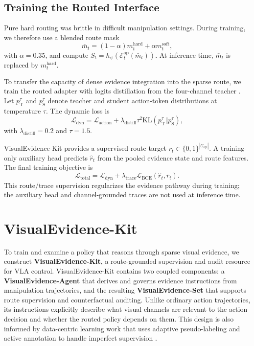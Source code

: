 \subsection{Training the Routed Interface}

Pure hard routing was brittle in difficult manipulation settings. During training, we therefore use a blended route mask
\begin{equation}
\bar m_t = (1-\alpha)m_t^{\mathrm{hard}} + \alpha m_t^{\mathrm{soft}},
\end{equation}
with $\alpha = 0.35$, and compute $S_t=h_{\psi}(\mathcal{E}_t^{\mathrm{op}}(\bar m_t))$. At inference time, $\bar m_t$ is replaced by $m_t^{\mathrm{hard}}$.

To transfer the capacity of dense evidence integration into the sparse route, we train the routed adapter with logits distillation from the four-channel \fullsoft{} teacher \citep{hinton2015distilling}. Let $p_{\mathrm{T}}^\tau$ and $p_{\mathrm{S}}^\tau$ denote teacher and student action-token distributions at temperature $\tau$. The dynamic loss is
\begin{equation}
\mathcal{L}_{\mathrm{dyn}}
= \mathcal{L}_{\mathrm{action}}
+ \lambda_{\mathrm{distill}}\tau^2
\mathrm{KL}(p_{\mathrm{T}}^\tau \Vert p_{\mathrm{S}}^\tau),
\end{equation}
with $\lambda_{\mathrm{distill}}=0.2$ and $\tau=1.5$.

VisualEvidence-Kit provides a supervised route target $r_t \in \{0,1\}^{|\mathcal{C}_{\mathrm{op}}|}$. A training-only auxiliary head predicts $\hat r_t$ from the pooled evidence state and route features. The final training objective is
\begin{equation}
\mathcal{L}_{\mathrm{total}}
= \mathcal{L}_{\mathrm{dyn}}
+ \lambda_{\mathrm{trace}}
\mathcal{L}_{\mathrm{BCE}}(\hat r_t, r_t).
\end{equation}
This route/trace supervision regularizes the evidence pathway during training; the auxiliary head and channel-grounded traces are not used at inference time.



\section{VisualEvidence-Kit}
\label{sec:visualevidence_kit}

To train and examine a policy that reasons through sparse visual evidence, we construct \textbf{VisualEvidence-Kit}, a route-grounded supervision and audit resource for VLA control. VisualEvidence-Kit contains two coupled components: a \textbf{VisualEvidence-Agent} that derives and governs evidence instructions from manipulation trajectories, and the resulting \textbf{VisualEvidence-Set} that supports route supervision and counterfactual auditing. Unlike ordinary action trajectories, its instructions explicitly describe what visual channels are relevant to the action decision and whether the routed policy depends on them. This design is also informed by data-centric learning work that uses adaptive pseudo-labeling and active annotation to handle imperfect supervision \citep{deyoung2020eraser,zhang2022boostmis}.

